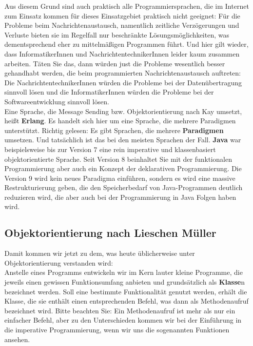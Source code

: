Aus diesem Grund sind auch praktisch alle Programmiersprachen, die im Internet zum Einsatz kommen für dieses Einsatzgebiet praktisch nicht geeignet: Für die Probleme beim Nachrichtenaustausch, namentlich zeitliche Verzögerungen und Verluste bieten sie im Regelfall nur beschränkte Lösungsmöglichkeiten, was dementsprechend eher zu mittelmäßigen Programmen führt. Und hier gilt wieder, dass InformatikerInnen und NachrichtentechnikerInnen leider kaum zusammen arbeiten. Täten Sie das, dann würden just die Probleme wesentlich besser gehandhabt werden, die beim programmierten Nachrichtenaustausch auftreten: Die NachrichtentechnikerInnen würden die Probleme bei der Datenübertragung sinnvoll lösen und die InformatikerInnen würden die Probleme bei der Softwareentwicklung sinnvoll lösen.\\

Eine Sprache, die Message Sending bzw. Objektorientierung nach Kay umsetzt, heißt \textbf{Erlang}. Es handelt sich hier um eine Sprache, die mehrere Paradigmen unterstützt. Richtig gelesen: Es gibt Sprachen, die mehrere \textbf{Paradigmen} umsetzen. Und tatsächlich ist das bei den meisten Sprachen der Fall. \textbf{Java} war beispielsweise bis zur Version 7 eine rein imperative und klassenbasiert objektorientierte Sprache. Seit Version 8 beinhaltet Sie mit der funktionalen Programmierung aber auch ein Konzept der deklarativen Programmierung. Die Version 9 wird kein neues Paradigma einführen, sondern es wird eine massive Restrukturierung geben, die den Speicherbedarf von Java-Programmen deutlich reduzieren wird, die aber auch bei der Programmierung in Java Folgen haben wird.

\subsection{Objektorientierung nach Lieschen Müller}
Damit kommen wir jetzt zu dem, was heute üblicherweise unter Objektorientierung verstanden wird: \\

Anstelle eines Programms entwickeln wir im Kern lauter kleine Programme, die jeweils einen gewissen Funktionsumfang anbieten und grundsätzlich als \textbf{Klasse}n bezeichnet werden. Soll eine bestimmte Funktionalität genutzt werden, erhält die Klasse, die sie enthält einen entsprechenden Befehl, was dann als Methodenaufruf bezeichnet wird. Bitte beachten Sie: Ein Methodenaufruf ist mehr als nur ein einfacher Befehl, aber zu den Unterschieden kommen wir bei der Einführung in die imperative Programmierung, wenn wir uns die sogenannten Funktionen ansehen.\\

